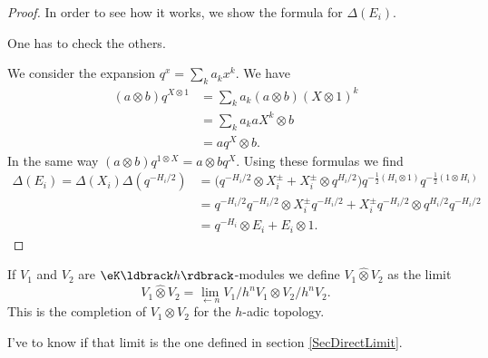 \begin{proof}
    In order to see how it works, we show the formula for \( \Delta(E_i)\).
    \begin{probleme}
        One has to check the others.
    \end{probleme}
    We consider the expansion \( q^{x}=\sum_ka_kx^k\). We have
    \begin{subequations}
        \begin{align}
            (a\otimes b)q^{X\otimes 1}&=\sum_ka_k(a\otimes b)(X\otimes 1)^k\\
            &=\sum_k a_k aX^k\otimes b\\
            &=aq^X\otimes b.
        \end{align}
    \end{subequations}
    In the same way \( (a\otimes b)q^{1\otimes X}=a\otimes bq^{X}\). Using these formulas we find
    \begin{subequations}
        \begin{align}
            \Delta(E_i)=\Delta(X_i)\Delta(q^{-H_i/2})&=\big( q^{-H_i/2}\otimes X_i^{\pm}+X_i^{\pm}\otimes q^{H_i/2} \big)q^{-\frac{ 1 }{2}(H_i\otimes 1)}q^{-\frac{ 1 }{2}(1\otimes H_i)}\\
            &=q^{-H_i/2}q^{-H_i/2}\otimes X_i^{\pm}q^{-H_i/2}+X_i^{\pm}q^{-H_i/2}\otimes q^{H_i/2}q^{-H_i/2}\\
            &=q^{-H_i}\otimes E_i+E_i\otimes 1.
        \end{align}
    \end{subequations}
\end{proof}

If \( V_1\) and \( V_2\) are \( \eK\ldbrack h\rdbrack\)-modules we define \( V_1\hat\otimes V_2\) as the limit
\begin{equation}
    V_1\hat\otimes V_2=\lim_{\leftarrow n}V_1/h^n V_1\otimes V_2/h^nV_2.
\end{equation}
This is the completion of \( V_1\otimes V_2\) for the \( h\)-adic topology.

\begin{probleme}
    I've to know if that limit is the one defined in section \ref{SecDirectLimit}.
\end{probleme}

